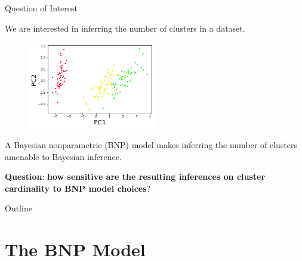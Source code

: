 \documentclass[10pt]{beamer}\usepackage[]{graphicx}\usepackage[]{color}
\begin{document}
\begin{frame}{Question of Interest}

We are interested in inferring the number of clusters in a dataset.

\pause
\begin{figure}[!h]
\centering
\includegraphics[width = 0.5\textwidth]{./images/iris_data.png}

\setlength{\textfloatsep}{-10pt}
\end{figure}
\pause

A Bayesian nonparametric (BNP) model makes inferring the number of clusters amenable to
Bayesian inference.

\pause

\textbf{Question}: \textbf{how sensitive are the resulting
inferences on cluster cardinality to BNP model choices}?

\end{frame}

\begin{frame}{Outline}
   \tableofcontents
\end{frame}

\section{The BNP Model}
\end{document}
